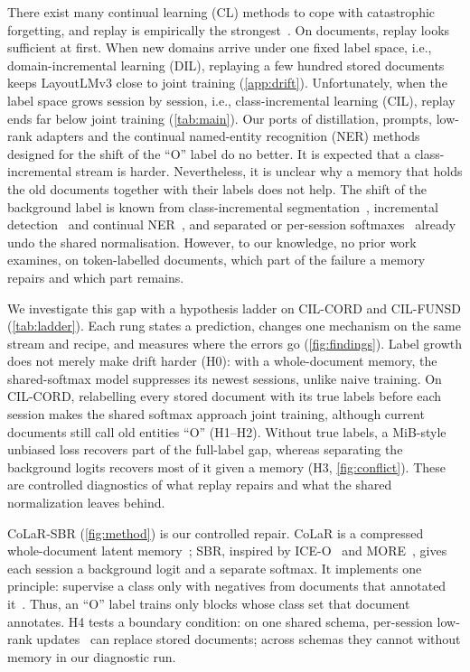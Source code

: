 \documentclass[10pt,twocolumn,letterpaper]{article}
\begin{document}
There exist many continual learning (CL) methods to cope with catastrophic forgetting, and replay is empirically the strongest~\citep{masana2022class,wang2024survey}. On documents, replay looks sufficient at first. When new domains arrive under one fixed label space, i.e., domain-incremental learning (DIL), replaying a few hundred stored documents keeps LayoutLMv3 close to joint training (\cref{app:drift}). Unfortunately, when the label space grows session by session, i.e., class-incremental learning (CIL), replay ends far below joint training (\cref{tab:main}). Our ports of distillation, prompts, low-rank adapters and the continual named-entity recognition (NER) methods designed for the shift of the ``O'' label do no better. It is expected that a class-incremental stream is harder. Nevertheless, it is unclear why a memory that holds the old documents together with their labels does not help. The shift of the background label is known from class-incremental segmentation~\citep{cermelli2020mib,douillard2021plop,cha2021ssul}, incremental detection~\citep{liu2023abr,mo2024bpf} and continual NER~\citep{monaikul2021extendner,zhang2023cpfd,ma2023learning}, and separated or per-session softmaxes~\citep{ahn2021ssil,kim2022more,liu2023ice} already undo the shared normalisation. However, to our knowledge, no prior work examines, on token-labelled documents, which part of the failure a memory repairs and which part remains.



We investigate this gap with a hypothesis ladder on CIL-CORD and CIL-FUNSD (\cref{tab:ladder}). Each rung states a prediction, changes one mechanism on the same stream and recipe, and measures where the errors go (\cref{fig:findings}). Label growth does not merely make drift harder (H0): with a whole-document memory, the shared-softmax model suppresses its newest sessions, unlike naive training. On CIL-CORD, relabelling every stored document with its true labels before each session makes the shared softmax approach joint training, although current documents still call old entities ``O'' (H1--H2). Without true labels, a MiB-style unbiased loss recovers part of the full-label gap, whereas separating the background logits recovers most of it given a memory (H3, \cref{fig:conflict}). These are controlled diagnostics of what replay repairs and what the shared normalization leaves behind.

CoLaR-SBR (\cref{fig:method}) is our controlled repair. CoLaR is a compressed whole-document latent memory~\citep{hayes2020remind,pellegrini2020latent}; SBR, inspired by ICE-O~\citep{liu2023ice} and MORE~\citep{kim2022more}, gives each session a background logit and a separate softmax. It implements one principle: supervise a class only with negatives from documents that annotated it~\citep{greenberg2018marginal}. Thus, an ``O'' label trains only blocks whose class set that document annotates. H4 tests a boundary condition: on one shared schema, per-session low-rank updates~\citep{hu2022lora} can replace stored documents; across schemas they cannot without memory in our diagnostic run.
\end{document}
